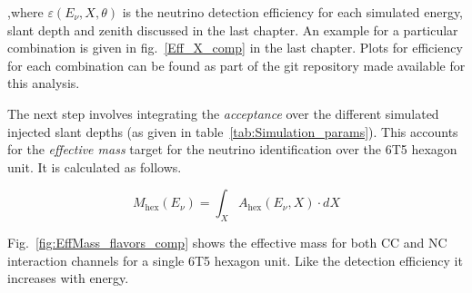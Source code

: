 ,where $\varepsilon(E_{\nu}, X, \theta)$ is the neutrino detection efficiency for each simulated energy, slant depth and zenith discussed in the last chapter. An example for a particular combination is given in fig.~\ref{Eff_X_comp} in the last chapter. Plots for efficiency for each combination can be found as part of the git repository made available for this analysis.

The next step involves integrating the \textit{acceptance} over the different simulated injected slant depths (as given in table~\ref{tab:Simulation_params}). This accounts for the \textit{effective mass} target for the neutrino identification over the 6T5 hexagon unit. It is calculated as follows. 

\begin{equation}
  \label{eq:nu_eff_mass}
  M_{\text{hex}}(E_{\nu}) = \int_X A_{\text{hex}}(E_{\nu}, X) \cdot dX
\end{equation}

Fig.~\ref{fig:EffMass_flavors_comp} shows the effective mass for both CC and NC interaction channels for a single 6T5 hexagon unit. Like the detection efficiency it increases with energy. 

